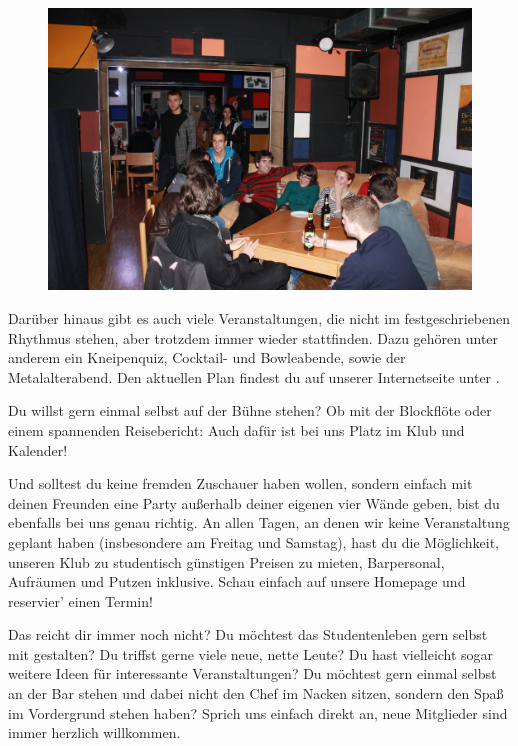 \begin{figure}%
  \vspace{-.4cm}
  \hspace{.03\linewidth}\includegraphics[width=.96\linewidth]{img/ese2013/cd.jpg}
  \vspace{-1cm}
\end{figure}

Darüber hinaus gibt es auch viele Veranstaltungen, die nicht im festgeschriebenen Rhythmus stehen, aber trotzdem immer wieder stattfinden.
Dazu gehören unter anderem ein Kneipenquiz, Cocktail- und Bowleabende, sowie der Metalalterabend.
Den aktuellen Plan findest du auf unserer Internetseite unter .

Du willst gern einmal selbst auf der Bühne stehen?
Ob mit der Blockflöte oder einem spannenden Reisebericht:
Auch dafür ist bei uns Platz im Klub und Kalender!

Und solltest du keine fremden Zuschauer haben wollen, sondern einfach mit deinen Freunden eine Party außerhalb deiner eigenen vier Wände geben, bist du ebenfalls bei uns genau richtig.
An allen Tagen, an denen wir keine Veranstaltung geplant haben (insbesondere am Freitag und Samstag), hast du die Möglichkeit, unseren Klub zu studentisch günstigen Preisen zu mieten, Barpersonal, Aufräumen und Putzen inklusive.
Schau einfach auf unsere Homepage und reservier' einen Termin!

Das reicht dir immer noch nicht?
Du möchtest das Studentenleben gern selbst mit gestalten?
Du triffst gerne viele neue, nette Leute?
Du hast vielleicht sogar weitere Ideen für interessante Veranstaltungen?
Du möchtest gern einmal selbst an der Bar stehen und dabei nicht den Chef im Nacken sitzen, sondern den Spaß im Vordergrund stehen haben?
Sprich uns einfach direkt an, neue Mitglieder sind immer herzlich willkommen.

